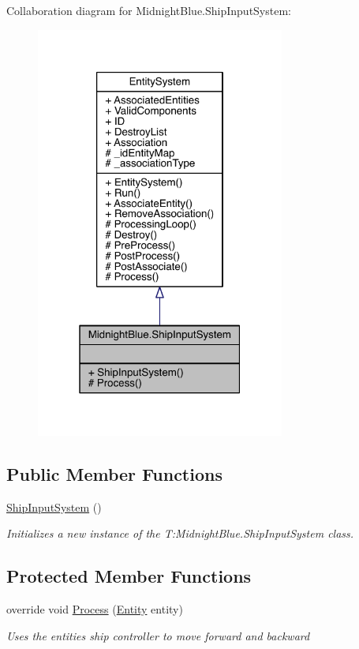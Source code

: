 Collaboration diagram for Midnight\+Blue.\+Ship\+Input\+System\+:
\nopagebreak
\begin{figure}[H]
\begin{center}
\leavevmode
\includegraphics[width=232pt]{class_midnight_blue_1_1_ship_input_system__coll__graph}
\end{center}
\end{figure}
\subsection*{Public Member Functions}
\begin{DoxyCompactItemize}
\item 
\hyperlink{class_midnight_blue_1_1_ship_input_system_ad7f804f91939a651c8e53ddb6bf55db6}{Ship\+Input\+System} ()
\begin{DoxyCompactList}\small\item\em Initializes a new instance of the T\+:\+Midnight\+Blue.\+Ship\+Input\+System class. \end{DoxyCompactList}\end{DoxyCompactItemize}
\subsection*{Protected Member Functions}
\begin{DoxyCompactItemize}
\item 
override void \hyperlink{class_midnight_blue_1_1_ship_input_system_ac504beb5b6afa47ca4618d9683e46946}{Process} (\hyperlink{class_midnight_blue_1_1_engine_1_1_entity_component_1_1_entity}{Entity} entity)
\begin{DoxyCompactList}\small\item\em Uses the entities ship controller to move forward and backward \end{DoxyCompactList}\end{DoxyCompactItemize}
